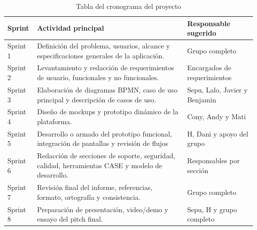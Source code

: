 \begin{table}[H]
	\centering 
	\caption{Tabla del cronograma del proyecto}
	\label{table: Tabla cronograma}
	\renewcommand{\arraystretch}{1.4}
	\begin{tabular}{|p{2cm}|p{10cm}|p{5cm}|}
		\hline 
		\centering\textbf{Sprint} & \centering\textbf{Actividad principal} & \centering\textbf{Responsable sugerido}\tabularnewline
		\hline 
		Sprint 1 & Definición del problema, usuarios, alcance y especificaciones generales de la aplicación. & Grupo completo \\
		\hline
		Sprint 2 & Levantamiento y redacción de requerimientos de usuario, funcionales y no funcionales. & Encargados de requerimientos \\
		\hline 
		Sprint 3 & Elaboración de diagramas BPMN, caso de uso principal y descripción de casos de uso. & Sepu, Lalo, Javier y Benjamin \\
		\hline 
		Sprint 4 & Diseño de mockups y prototipo dinámico de la plataforma. & Cony, Andy y Mati \\
		\hline 
		Sprint 5 & Desarrollo o armado del prototipo funcional, integración de pantallas y revisión de flujos & H, Dani y apoyo del grupo \\
		\hline 
		Sprint 6 & Redacción de secciones de soporte, seguridad, calidad, herramientas CASE y modelo de desarrollo. & Responsables por sección \\
		\hline 
		Sprint 7 & Revisión final del informe, referencias, formato, ortografía y consistencia. & Grupo completo\\
		\hline 
		Sprint 8 & Preparación de presentación, video/demo y ensayo del pitch final. & Sepu, H y grupo completo \\
		\hline 
	\end{tabular}
\end{table}




